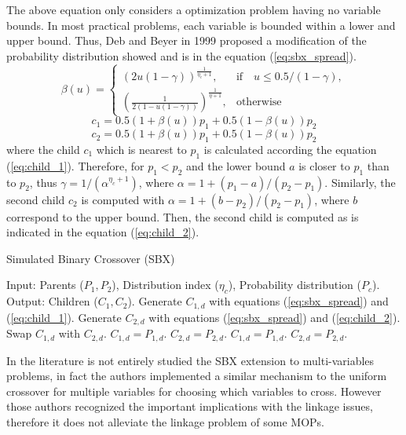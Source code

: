 The above equation only considers a optimization problem having no variable bounds.
%
In most practical problems, each variable is bounded within a lower and upper bound.
%
Thus, Deb and Beyer in 1999 \cite{deb1999self} proposed a modification of the probability distribution showed and is in the equation (\ref{eq:sbx_spread}).
%
\begin{equation} \label{eq:sbx_spread}
    \beta(u)= 
\begin{cases}
     (2u(1-\gamma))^{\frac{1}{\eta_c+1}},& \text{if} \quad u \leq 0.5/(1-\gamma),\\
     	(\frac{1}{2(1-u(1-\gamma))})^{\frac{1}{\eta+1}} ,& \text{otherwise}
\end{cases}
\end{equation}
\begin{equation} \label{eq:child_1}
c_1 = 0.5(1 + \beta(u))p_1 + 0.5(1-\beta(u))p_2
\end{equation}
\begin{equation} \label{eq:child_2}
c_2 = 0.5(1 + \beta(u))p_1 + 0.5(1-\beta(u))p_2
\end{equation}
where the child $c_1$ which is nearest to $p_1$ is calculated according the equation (\ref{eq:child_1}).
%
Therefore, for $p_1 < p_2$ and the lower bound $a$ is closer to $p_1$ than to $p_2$, thus $\gamma = 1/(\alpha^{\eta_c + 1})$, where $\alpha = 1 + (p_1 - a) / (p_2 - p_1)$.
%
Similarly, the second child $c_2$ is computed with $\alpha = 1 + (b-p_2)/(p_2 - p_1)$, where $b$ correspond to the upper bound.
%
Then, the second child is computed as is indicated in the equation (\ref{eq:child_2}).
\begin{algorithm}[t]
\scriptsize
\caption{Simulated Binary Crossover (SBX)}
\label{alg:SBX_Operator}
\begin{algorithmic}[1]
    \STATE Input: Parents ($P_{1}, P_{2}$), Distribution index ($\eta_c$), Probability distribution ($P_c$).
    \STATE Output: Children ($C_{1}, C_{2}$).
	 \label{alg:inherit_variable}
		\STATE Generate $C_{1,d}$ with equations (\ref{eq:sbx_spread}) and (\ref{eq:child_1}).
		\STATE Generate $C_{2,d}$ with equations (\ref{eq:sbx_spread}) and (\ref{eq:child_2}).
			\STATE Swap $C_{1,d}$ with $C_{2,d}$.
		 \ENDIF
        \ELSE
	   \STATE $C_{1,d} = P_{1, d}$.
	   \STATE $C_{2,d} = P_{2, d}$.
        \ENDIF
       \ENDFOR
    \ELSE
	\STATE $C_{1,d} = P_{1,d}$.
	\STATE $C_{2,d} = P_{2,d}$.
    \ENDIF
\end{algorithmic}
\end{algorithm}
In the literature \cite{Joel:SBX1994} is not entirely studied the SBX extension to multi-variables problems, in fact the authors implemented a similar mechanism to the uniform crossover for multiple variables \cite{Joel:UNDX} for choosing which variables to cross.
%
However those authors recognized the important implications with the linkage issues, therefore it does not alleviate the linkage problem of some MOPs.
%

